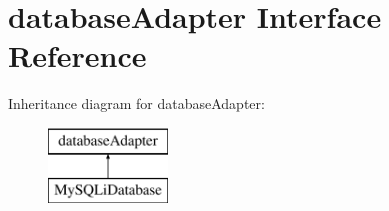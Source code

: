 \hypertarget{interfacedatabase_adapter}{
\section{databaseAdapter Interface Reference}
\label{interfacedatabase_adapter}
}
Inheritance diagram for databaseAdapter:\begin{figure}[H]
\begin{center}
\leavevmode
\includegraphics[height=2.000000cm]{interfacedatabase_adapter}
\end{center}
\end{figure}

